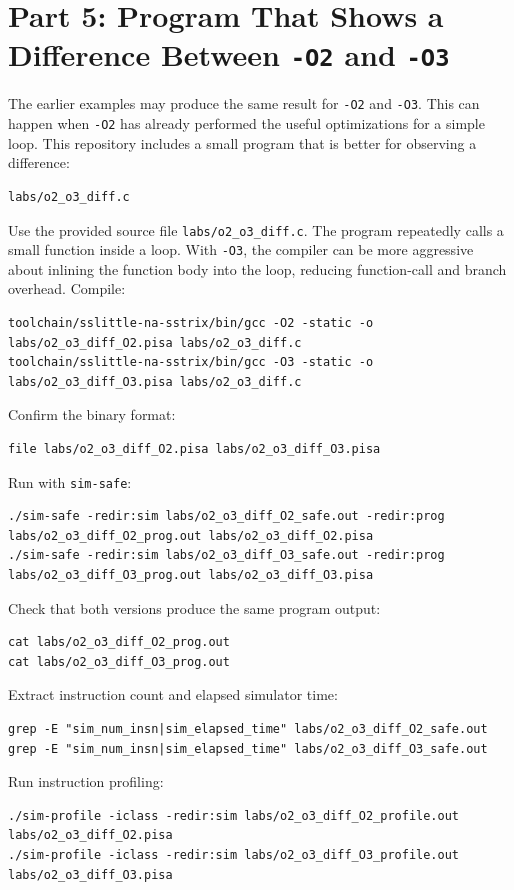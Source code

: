 \documentclass[11pt]{article}
\begin{document}
\section{Part 5: Program That Shows a Difference Between \texttt{-O2} and \texttt{-O3}}
The earlier examples may produce the same result for \texttt{-O2} and \texttt{-O3}. This can happen when \texttt{-O2} has already performed the useful optimizations for a simple loop.
This repository includes a small program that is better for observing a difference:
\begin{lstlisting}
labs/o2_o3_diff.c
\end{lstlisting}
Use the provided source file \texttt{labs/o2\_o3\_diff.c}. The program repeatedly calls a small function inside a loop. With \texttt{-O3}, the compiler can be more aggressive about inlining the function body into the loop, reducing function-call and branch overhead.
Compile:
\begin{lstlisting}
toolchain/sslittle-na-sstrix/bin/gcc -O2 -static -o labs/o2_o3_diff_O2.pisa labs/o2_o3_diff.c
toolchain/sslittle-na-sstrix/bin/gcc -O3 -static -o labs/o2_o3_diff_O3.pisa labs/o2_o3_diff.c
\end{lstlisting}
Confirm the binary format:
\begin{lstlisting}
file labs/o2_o3_diff_O2.pisa labs/o2_o3_diff_O3.pisa
\end{lstlisting}
Run with \texttt{sim-safe}:
\begin{lstlisting}
./sim-safe -redir:sim labs/o2_o3_diff_O2_safe.out -redir:prog labs/o2_o3_diff_O2_prog.out labs/o2_o3_diff_O2.pisa
./sim-safe -redir:sim labs/o2_o3_diff_O3_safe.out -redir:prog labs/o2_o3_diff_O3_prog.out labs/o2_o3_diff_O3.pisa
\end{lstlisting}
Check that both versions produce the same program output:
\begin{lstlisting}
cat labs/o2_o3_diff_O2_prog.out
cat labs/o2_o3_diff_O3_prog.out
\end{lstlisting}
Extract instruction count and elapsed simulator time:
\begin{lstlisting}
grep -E "sim_num_insn|sim_elapsed_time" labs/o2_o3_diff_O2_safe.out
grep -E "sim_num_insn|sim_elapsed_time" labs/o2_o3_diff_O3_safe.out
\end{lstlisting}
Run instruction profiling:
\begin{lstlisting}
./sim-profile -iclass -redir:sim labs/o2_o3_diff_O2_profile.out labs/o2_o3_diff_O2.pisa
./sim-profile -iclass -redir:sim labs/o2_o3_diff_O3_profile.out labs/o2_o3_diff_O3.pisa
\end{lstlisting}
\end{document}
